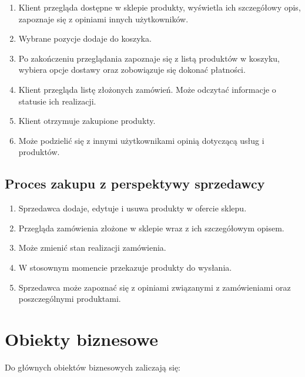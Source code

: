 \documentclass[a4paper]{article}
\begin{document}
\begin{enumerate}
	\item Klient przegląda dostępne w sklepie produkty, wyświetla ich szczegółowy opis, zapoznaje się z opiniami innych użytkowników.
	\item Wybrane pozycje dodaje do koszyka.
	\item Po zakończeniu przeglądania zapoznaje się z listą produktów w koszyku, wybiera opcje dostawy oraz zobowiązuje się dokonać płatności.
	\item Klient przegląda listę złożonych zamówień. Może odczytać informacje o statusie ich realizacji.
	\item Klient otrzymuje zakupione produkty.
	\item Może podzielić się z innymi użytkownikami opinią dotyczącą usług i produktów.
\end{enumerate}

\subsection{Proces zakupu z perspektywy sprzedawcy}

\begin{enumerate}
	\item Sprzedawca dodaje, edytuje i usuwa produkty w ofercie sklepu.
	\item Przegląda zamówienia złożone w sklepie wraz z ich szczegółowym opisem.
	\item Może zmienić stan realizacji zamówienia.
	\item W stosownym momencie przekazuje produkty do wysłania.
	\item Sprzedawca może zapoznać się z opiniami związanymi z zamówieniami oraz poszczególnymi produktami.
\end{enumerate}

\section{Obiekty biznesowe}

Do głównych obiektów biznesowych zaliczają się:
\end{document}
